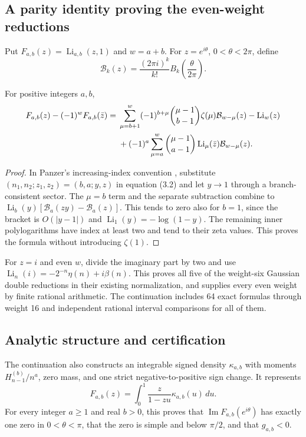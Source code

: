 \subsection{A parity identity proving the even-weight reductions}
Put $F_{a,b}(z)=\operatorname{Li}_{a,b}(z,1)$ and $w=a+b$. For
$z=e^{i\theta}$, $0<\theta<2\pi$, define
\[
 \mathcal B_k(z)=\frac{(2\pi i)^k}{k!}B_k\!\left(\frac\theta{2\pi}\right).
\]
\begin{theorem}
\label{gcc:parity}
For positive integers $a,b$,
\begin{align}
 F_{a,b}(z)-(-1)^wF_{a,b}(\bar z)
 ={}&\sum_{\mu=b+1}^w(-1)^{b+\mu}\binom{\mu-1}{b-1}
       \zeta(\mu)\mathcal B_{w-\mu}(z)-\operatorname{Li}_w(z)\notag\\
 &+(-1)^a\sum_{\mu=a}^w\binom{\mu-1}{a-1}
       \operatorname{Li}_\mu(\bar z)\mathcal B_{w-\mu}(z).
\end{align}
\end{theorem}
\begin{proof}
In Panzer's increasing-index convention \cite{gcc:Panzer}, substitute
$(n_1,n_2;z_1,z_2)=(b,a;y,z)$ in equation (3.2) and let $y\to1$ through a
branch-consistent sector. The $\mu=b$ term and the separate subtraction combine
to $\operatorname{Li}_b(y)[\mathcal B_a(zy)-\mathcal B_a(z)]$. This tends to zero
also for $b=1$, since the bracket is $O(|y-1|)$ and
$\operatorname{Li}_1(y)=-\log(1-y)$. The remaining inner polylogarithms have index
at least two and tend to their zeta values.  This proves the formula without
introducing $\zeta(1)$.
\end{proof}
For $z=i$ and even $w$, divide the imaginary part by two and use
$\operatorname{Li}_n(i)=-2^{-n}\eta(n)+i\beta(n)$. This proves all five of the
weight-six Gaussian double reductions in their existing normalization, and
supplies every even weight by finite rational arithmetic. The continuation
\cite{gcc:continuation} includes 64 exact formulas through weight 16 and
independent rational interval comparisons for all of them.

\subsection{Analytic structure and certification}
The continuation also constructs an integrable signed density
$\kappa_{a,b}$ with moments $H_{n-1}^{(b)}/n^a$, zero mass, and one strict
negative-to-positive sign change. It represents
\[
 F_{a,b}(z)=\int_0^1\frac{z}{1-zu}\kappa_{a,b}(u)\,du.
\]
For every integer $a\ge1$ and real $b>0$, this proves that
$\operatorname{Im}F_{a,b}(e^{i\theta})$ has exactly one zero in $0<\theta<\pi$,
that the zero is simple and below $\pi/2$, and that $g_{a,b}<0$.

